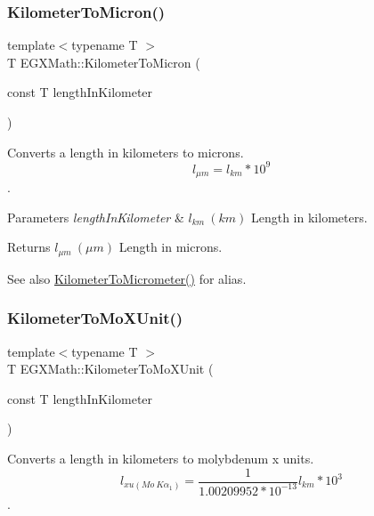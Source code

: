 \subsubsection{\texorpdfstring{Kilometer\+To\+Micron()}{KilometerToMicron()}}
{\footnotesize\ttfamily template$<$typename T $>$ \\
T E\+G\+X\+Math\+::\+Kilometer\+To\+Micron (\begin{DoxyParamCaption}\item[{const T}]{length\+In\+Kilometer }\end{DoxyParamCaption})}



Converts a length in kilometers to microns. \[ l_{\mu m}=l_{km} * 10^{9} \]. 


\begin{DoxyParams}{Parameters}
{\em length\+In\+Kilometer} & $ l_{km}\ (km)$ Length in kilometers. \\
\hline
\end{DoxyParams}
\begin{DoxyReturn}{Returns}
$ l_{\mu m}\ (\mu m)$ Length in microns. 
\end{DoxyReturn}
\begin{DoxySeeAlso}{See also}
\mbox{\hyperlink{group___e_g_x_math-_conversions-_length_conversions-_kilometer-_s_i_ga345d16c72fcb96ff1dc3b7f290b94c94}{Kilometer\+To\+Micrometer()}} for alias. 
\end{DoxySeeAlso}
\mbox{\label{group___e_g_x_math-_conversions-_length_conversions-_kilometer-_non-_s_i_ga547782594ebd0cc3e565f6d32f9528df}} 
\subsubsection{\texorpdfstring{Kilometer\+To\+Mo\+X\+Unit()}{KilometerToMoXUnit()}}
{\footnotesize\ttfamily template$<$typename T $>$ \\
T E\+G\+X\+Math\+::\+Kilometer\+To\+Mo\+X\+Unit (\begin{DoxyParamCaption}\item[{const T}]{length\+In\+Kilometer }\end{DoxyParamCaption})}



Converts a length in kilometers to molybdenum x units. \[ l_{xu(Mo\ K\alpha_1)}=\frac{1}{1.00209952*10^{-13}} l_{km} * 10^{3}\]. 


